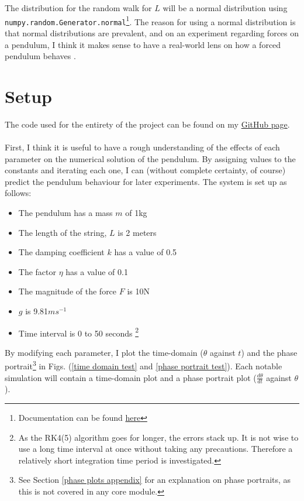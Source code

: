 \documentclass[10pt, twocolumn]{article}
\begin{document}
The distribution for the random walk for $L$ will be a normal distribution using \verb|numpy.random.Generator.normal|\footnote{Documentation can be found \href{https://numpy.org/doc/stable/reference/random/generated/numpy.random.Generator.normal.html}{here}}. The reason for using a normal distribution is that normal distributions are prevalent, and on an experiment regarding forces on a pendulum, I think it makes sense to have a real-world lens on how a forced pendulum behaves \cite{Peebles2001}.

\section{Setup}\label{setup}
The code used for the entirety of the project can be found on my \href{https://github.com/linsuong/PHYS-6017-Labs/blob/main/Projects/ForcedSimplePendulum}{GitHub page}. 
\\
\\
First, I think it is useful to have a rough understanding of the effects of each parameter on the numerical solution of the pendulum. By assigning values to the constants and iterating each one, I can (without complete certainty, of course) predict the pendulum behaviour for later experiments.
The system is set up as follows:
\begin{itemize}
    \item The pendulum has a mass $m$ of 1kg
    \item The length of the string, $L$ is 2 meters
    \item The damping coefficient $k$ has a value of 0.5
    \item The factor $\eta$ has a value of 0.1
    \item The magnitude of the force $F$ is 10N
    \item $g$ is 9.81$ms^{-1}$
    \item Time interval is 0 to 50 seconds \footnote{As the RK4(5) algorithm goes for longer, the errors stack up. It is not wise to use a long time interval at once without taking any precautions. Therefore a relatively short integration time period is investigated.}
\end{itemize}
By modifying each parameter, I plot the time-domain ($\theta$ against $t$) and the phase portrait\footnote{See Section \ref{phase plots appendix} for an explanation on phase portraits, as this is not covered in any core module.}  in Figs. (\ref{time domain test} and \ref{phase portrait test}). Each notable simulation will contain a time-domain plot and a phase portrait plot ($\frac{d\theta}{dt}$ against $\theta$). \\
\end{document}
